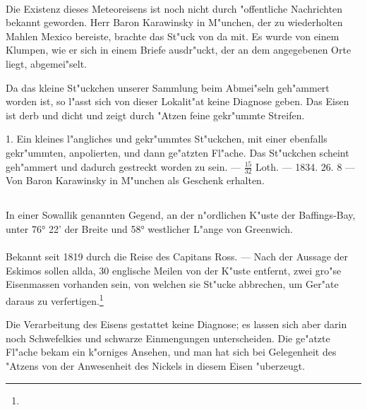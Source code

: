 \documentclass[a4paper, 11pt, oneside, polutonikogreek, german]{article}
\begin{document}
\paragraph{}
Die Existenz dieses Meteoreisens ist noch nicht durch "offentliche Nachrichten bekannt geworden. Herr Baron Karawinsky in M"unchen, der zu wiederholten Mahlen Mexico bereiste, brachte das St"uck von da mit. Es wurde von einem Klumpen, wie er sich in einem Briefe ausdr"uckt, der an dem angegebenen Orte liegt, abgemei"selt.

Da das kleine St"uckchen unserer Sammlung beim Abmei"seln geh"ammert worden ist, so l"asst sich von dieser Lokalit"at keine Diagnose geben. Das Eisen ist derb und dicht und zeigt durch "Atzen feine gekr"ummte Streifen.

1. Ein kleines l"angliches und gekr"ummtes St"uckchen, mit einer ebenfalls gekr"ummten, anpolierten, und dann ge"atzten Fl"ache. Das St"uckchen scheint geh"ammert und dadurch gestreckt worden zu sein. --- $\mathfrak{\frac{15}{32}}$ Loth. --- 1834. 26. 8 --- Von Baron Karawinsky in M"unchen als Geschenk erhalten.
\subsection{}
\begin{center}

In einer Sowallik genannten Gegend, an der n"ordlichen K"uste der Baffings-Bay, unter 76° 22' der Breite und 58° westlicher L"ange von Greenwich.
\end{center}
\paragraph{}
Bekannt seit 1819 durch die Reise des Capitans Ross. --- Nach der Aussage der Eskimos sollen allda, 30 englische Meilen von der K"uste entfernt, zwei gro"se Eisenmassen vorhanden sein, von welchen sie St"ucke abbrechen, um Ger"ate daraus zu verfertigen.\footnote{}

Die Verarbeitung des Eisens gestattet keine Diagnose; es lassen sich aber darin noch Schwefelkies und schwarze Einmengungen unterscheiden. Die ge"atzte Fl"ache bekam ein k"orniges Ansehen, und man hat sich bei Gelegenheit des "Atzens von der Anwesenheit des Nickels in diesem Eisen "uberzeugt.
\end{document}
